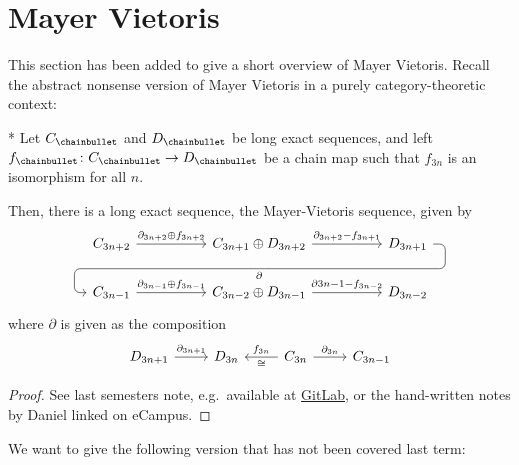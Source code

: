 \section{Mayer Vietoris}

This section has been added to give a short overview of Mayer Vietoris.
Recall the abstract nonsense version of Mayer Vietoris in a purely
category-theoretic context:

\begin{lemma}*
  \label{lm:mayer-vietoris-abstract-nonsense}
  Let $C_\chainbullet $ and $D_\chainbullet $ be long exact sequences,
  and left $f_\chainbullet \colon C_\chainbullet  \to  D_\chainbullet $
  be a chain map such that $f_{3n}$ is an isomorphism for all $n$.

  Then, there is a long exact sequence, the Mayer-Vietoris sequence,
  given by
  \[
  \begin{tikzcd}[column sep = 5em]
    C_{3n+2}
    \ar{r}{\partial _{3n+2} \oplus f_{3n+2}} &  
    C_{3n+1} \oplus D_{3n+2}
    \ar[draw=none]{d}[name=X,anchor=center]{}
    \ar{r}{\partial _{3n+2} - f_{3n+1}} &  
    D_{3n+1}
    \ar[rounded corners,
              to path={ -- ([xshift=2ex]\tikztostart.east)
                        |- (X.center) \tikztonodes
                        -| ([xshift=-2ex]\tikztotarget.west)
                        -- (\tikztotarget)}]{dll}[at end]{\partial } \\
    C_{3n-1}
    \ar{r}{\partial _{3n-1} \oplus f_{3n-1}} &
    C_{3n-2} \oplus D_{3n-1}
    \ar{r}{\partial 3n-1 - f_{3n-2}} &
    D_{3n-2}
  \end{tikzcd}
\]
  where $\partial$ is given as the composition
  \[
  \begin{tikzcd}
    D_{3n+1} \ar{r}{\partial _{3n+1}} &  D_{3n} & C_{3n} \ar{l}{\cong}[swap]{f_{3n}} \ar{r}{\partial _{3n}} &  C_{3n-1}
  \end{tikzcd}
  \]
\end{lemma}

\begin{proof}
  See last semesters note, e.g.~available at
  \href{https://latexci.gitlab.io/lecture-notes-bonn/TopologyI/2021_Topology_I.pdf}{GitLab},
  or the hand-written notes by Daniel linked on eCampus.
\end{proof}

We want to give the following version that has not been covered last term:


